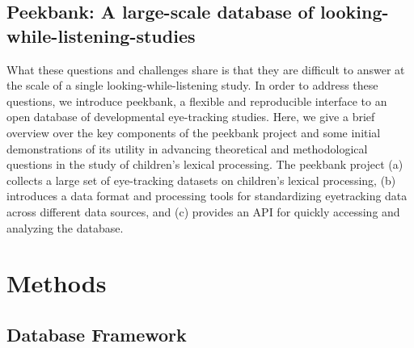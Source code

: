 \documentclass[10pt, letterpaper]{article}
\begin{document}
\hypertarget{peekbank-a-large-scale-database-of-looking-while-listening-studies}{%
\subsection{Peekbank: A large-scale database of
looking-while-listening-studies}\label{peekbank-a-large-scale-database-of-looking-while-listening-studies}}

What these questions and challenges share is that they are difficult to
answer at the scale of a single looking-while-listening study. In order
to address these questions, we introduce peekbank, a flexible and
reproducible interface to an open database of developmental eye-tracking
studies. Here, we give a brief overview over the key components of the
peekbank project and some initial demonstrations of its utility in
advancing theoretical and methodological questions in the study of
children's lexical processing. The peekbank project (a) collects a large
set of eye-tracking datasets on children's lexical processing, (b)
introduces a data format and processing tools for standardizing
eyetracking data across different data sources, and (c) provides an API
for quickly accessing and analyzing the database.

\hypertarget{methods}{%
\section{Methods}\label{methods}}

\hypertarget{database-framework}{%
\subsection{Database Framework}\label{database-framework}}
\end{document}
